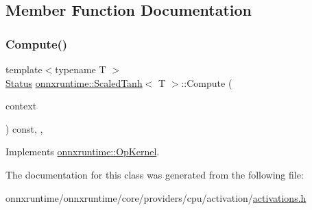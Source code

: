 \subsection{Member Function Documentation}
\mbox{\label{classonnxruntime_1_1ScaledTanh_a55a336b0faa64cc9a1a228df25086373}} 
\subsubsection{\texorpdfstring{Compute()}{Compute()}}
{\footnotesize\ttfamily template$<$typename T $>$ \\
\mbox{\hyperlink{classonnxruntime_1_1common_1_1Status}{Status}} \mbox{\hyperlink{classonnxruntime_1_1ScaledTanh}{onnxruntime\+::\+Scaled\+Tanh}}$<$ T $>$\+::Compute (\begin{DoxyParamCaption}\item[{\mbox{\hyperlink{classonnxruntime_1_1OpKernelContext}{Op\+Kernel\+Context}} $\ast$}]{context }\end{DoxyParamCaption}) const\hspace{0.3cm}{\ttfamily [inline]}, {\ttfamily [override]}, {\ttfamily [virtual]}}



Implements \mbox{\hyperlink{classonnxruntime_1_1OpKernel_a9eca8656a78b1b3ab9d3351a12798650}{onnxruntime\+::\+Op\+Kernel}}.



The documentation for this class was generated from the following file\+:\begin{DoxyCompactItemize}
\item 
onnxruntime/onnxruntime/core/providers/cpu/activation/\mbox{\hyperlink{cpu_2activation_2activations_8h}{activations.\+h}}\end{DoxyCompactItemize}
